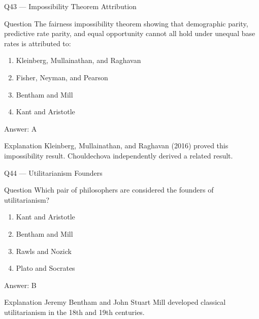 \documentclass[aspectratio=169,8pt]{beamer}
\begin{document}
	\begin{frame}{Q43 --- Impossibility Theorem Attribution}
		\begin{block}{Question}
			The fairness impossibility theorem showing that demographic parity, predictive rate parity, and equal opportunity cannot all hold under unequal base rates is attributed to:
			\begin{enumerate}
				\item Kleinberg, Mullainathan, and Raghavan
				\item Fisher, Neyman, and Pearson
				\item Bentham and Mill
				\item Kant and Aristotle
			\end{enumerate}
		\end{block}
		\begin{exampleblock}{Answer: A}\end{exampleblock}
		\begin{block}{Explanation}
			Kleinberg, Mullainathan, and Raghavan (2016) proved this impossibility result. Chouldechova independently derived a related result.
		\end{block}
	\end{frame}
	
	\begin{frame}{Q44 --- Utilitarianism Founders}
		\begin{block}{Question}
			Which pair of philosophers are considered the founders of utilitarianism?
			\begin{enumerate}
				\item Kant and Aristotle
				\item Bentham and Mill
				\item Rawls and Nozick
				\item Plato and Socrates
			\end{enumerate}
		\end{block}
		\begin{exampleblock}{Answer: B}\end{exampleblock}
		\begin{block}{Explanation}
			Jeremy Bentham and John Stuart Mill developed classical utilitarianism in the 18th and 19th centuries.
		\end{block}
	\end{frame}
	
\end{document}
